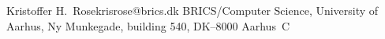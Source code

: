 \ifx\xyloaded\undefined  \fi
{}%
 {Kristoffer H.~Rose}{krisrose@brics.dk}%
 {BRICS/Computer Science, University of Aarhus, Ny Munkegade, building 540,
 DK--8000 Aarhus~C}
\xyendinput
